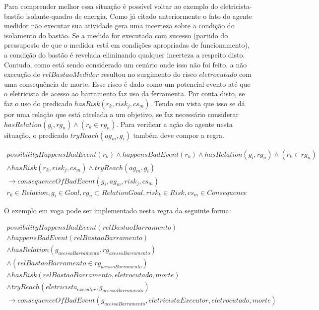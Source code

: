 Para comprender melhor essa situação é possível voltar ao exemplo do eletricista-bastão isolante-quadro de energia. Como já citado anteriormente o fato 
do agente medidor não executar sua atividade gera uma incerteza sobre a condição do isolamento do bastão. Se a medida for executada com sucesso 
(partido do pressuposto de que o medidor está em condições apropriadas de funcionamento), a condição do bastão é revelada eliminando qualquer incerteza 
a respeito disto. Contudo, como está sendo considerado um cenário onde isso não foi feito, a não execução de $relBastaoMedidor$ resultou no surgimento 
do risco $eletrocutado$ com uma consequência de morte. Esse risco é dado como um potencial evento até que o eletricista de acesso ao barramento faz uso da 
ferramenta. Por conta disto, se faz o uso do predicado $hasRisk(r_k,risk_j,cs_m)$. Tendo em vista que isso se dá por uma relação que está atrelada a um 
objetivo, se faz necessário considerar $hasRelation(g_i,rg_n) \wedge (r_k \in rg_n)$. Para verificar a ação do agente nesta situação, o predicado 
$tryReach(ag_m,g_i)$ também deve compor a regra.


\begin{eqnarray}\label{paybutiamnotguilty}
	possibilityHappensBadEvent(r_k) \wedge  happensBadEvent(r_k) \wedge hasRelation(g_i,rg_n) \wedge (r_k \in rg_n) \nonumber \\ 
	\wedge hasRisk(r_k,risk_j,cs_m) \wedge tryReach(ag_m,g_i) \nonumber \\ 
	\to consequenceOfBadEvent(g_i,ag_m,risk_j,cs_m) \nonumber \\ 
    r_k \in Relation, g_i \in Goal, rg_n \subset RelationGoal, risk_k \in Risk, cs_m \in Consequence
\end{eqnarray}

O exemplo em voga pode ser implementado nesta regra da seguinte forma: 


\begin{eqnarray}\nonumber
   possibilityHappensBadEvent(relBastaoBarramento) \nonumber \\
    \wedge happensBadEvent(relBastaoBarramento) \nonumber \\ 
    \wedge hasRelation(g_{acessoBarramento},rg_{acessoBarramento}) \nonumber \\  
    \wedge (relBastaoBarramento \in rg_{acessoBarramento}) \nonumber \\ 
    \wedge hasRisk(relBastaoBarramento,eletrocutado,morte) \nonumber \\  
    \wedge tryReach(eletricista_{executor},g_{acessoBarramento}) \nonumber \\ 
    \to consequenceOfBadEvent(g_{acessoBarramento},eletricistaExecutor,eletrocutado,morte) \\ \nonumber
\end{eqnarray}

